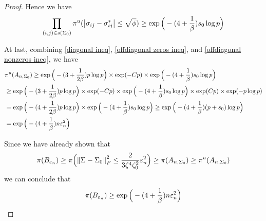 \begin{proof}
    Hence we have
    \begin{equation} \label{offdiagonal nonzeros ineq}
        \prod_{(i,j)\in s(\Sigma_0)}\pi^u(\abs{\sigma_{ij} - \sigma_{ij}^*}\leq \sqrt \phi) \geq \exp\Big(-(4+\frac 1\beta)s_0\log p \Big)  
    \end{equation}

    At last, combining \eqref{diagonal ineq}, \eqref{offdiagonal zeros ineq}, and \eqref{offdiagonal nonzeros ineq}, we have
    \begin{align*}
        &\pi^u(A_{n, \Sigma_0}) \geq \exp\Big(-(3+\frac{1}{2\beta})p \log p\Big) \times \exp(-Cp) \times \exp\Big(-(4+\frac 1\beta)s_0\log p \Big)  \\
        &\geq \exp\Big(-(3+\frac{1}{2\beta})p \log p\Big) \times \exp(-Cp) \times \exp\Big(-(4+\frac 1\beta)s_0\log p \Big) \times \exp(Cp) \times \exp(-p\log p) \\
        &= \exp\Big(-(4+\frac{1}{2\beta})p \log p\Big) \times \exp\Big(-(4+\frac 1\beta)s_0\log p \Big) \geq \exp\Big(-(4+\frac 1\beta)(p+s_0)\log p\Big) \\
        &= \exp\Big(-(4+\frac 1\beta)n\varepsilon_n^2 \Big)
    \end{align*}

    Since we have already shown that \[\pi(B_{\varepsilon_n}) \geq \pi\Big(\norm{\Sigma- \Sigma_0}_F^2 \leq \frac{2}{3\zeta^4\zeta_0^2}\varepsilon_n^2\Big) \geq \pi(A_{n, \Sigma_0})\geq \pi^u(A_{n, \Sigma_0}) \] we can conclude that 
    \[\pi(B_{\varepsilon_n}) \geq \exp\Big(-(4+\frac 1\beta) n\varepsilon_n^2 \Big) \]


\end{proof}

